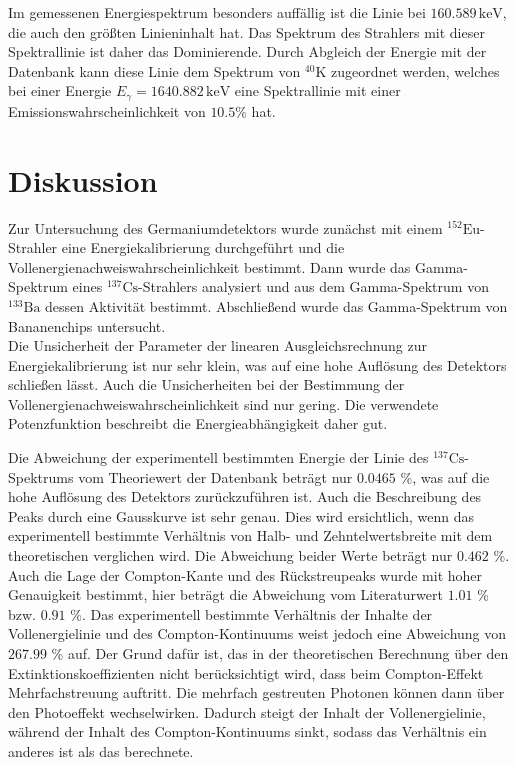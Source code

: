 \noindent
Im gemessenen Energiespektrum besonders auffällig ist die Linie bei $160.589 \, \text{keV}$, die 
auch den größten Linieninhalt hat. Das Spektrum des Strahlers mit dieser Spektrallinie ist daher das Dominierende.
Durch Abgleich der Energie mit der Datenbank \cite{Datenbank} kann diese Linie dem 
Spektrum von $^{40}\text{K}$ zugeordnet werden, welches bei einer Energie $E_\gamma = 1640.882 \, \text{keV}$ eine Spektrallinie
mit einer Emissionswahrscheinlichkeit von $10.5 \%$ hat.

\section{Diskussion}
Zur Untersuchung des Germaniumdetektors wurde zunächst mit einem $^{152}\text{Eu}$-Strahler eine Energiekalibrierung 
durchgeführt und die Vollenergienachweiswahrscheinlichkeit bestimmt. Dann wurde das Gamma-Spektrum eines $^{137}\text{Cs}$-Strahlers analysiert
und aus dem Gamma-Spektrum von $^{133}\text{Ba}$ dessen Aktivität bestimmt. 
Abschließend wurde das Gamma-Spektrum von Bananenchips untersucht. \\

Die Unsicherheit der Parameter der linearen Ausgleichsrechnung zur Energiekalibrierung ist nur sehr klein, 
was auf eine hohe Auflösung des Detektors schließen lässt. Auch die Unsicherheiten bei der Bestimmung der Vollenergienachweiswahrscheinlichkeit 
sind nur gering. Die verwendete Potenzfunktion beschreibt die Energieabhängigkeit daher gut.

Die Abweichung der experimentell bestimmten Energie der Linie des $^{137}\text{Cs}$-Spektrums
vom Theoriewert der Datenbank \cite{Datenbank} beträgt nur $\num{0.0465}$ \%, was auf die hohe Auflösung des Detektors 
zurückzuführen ist. 
Auch die Beschreibung des Peaks durch eine Gausskurve ist sehr genau. Dies wird ersichtlich, wenn das 
experimentell bestimmte Verhältnis von Halb- und Zehntelwertsbreite mit dem theoretischen verglichen wird. 
Die Abweichung beider Werte beträgt nur $\num{0.462}$ \%.
Auch die Lage der Compton-Kante und des Rückstreupeaks wurde mit hoher Genauigkeit bestimmt, hier beträgt
die Abweichung vom Literaturwert $\num{1.01}$ \% bzw. $\num{0.91}$ \%.
Das experimentell bestimmte Verhältnis der Inhalte der Vollenergielinie und des Compton-Kontinuums 
weist jedoch eine Abweichung von $\num{267.99}$ \% auf. Der Grund dafür ist, das in der theoretischen Berechnung über den 
Extinktionskoeffizienten nicht berücksichtigt wird, dass beim Compton-Effekt Mehrfachstreuung 
auftritt. Die mehrfach gestreuten Photonen können dann über den Photoeffekt wechselwirken.
Dadurch steigt der Inhalt der Vollenergielinie, während der Inhalt des Compton-Kontinuums sinkt, sodass das 
Verhältnis ein anderes ist als das berechnete.  

